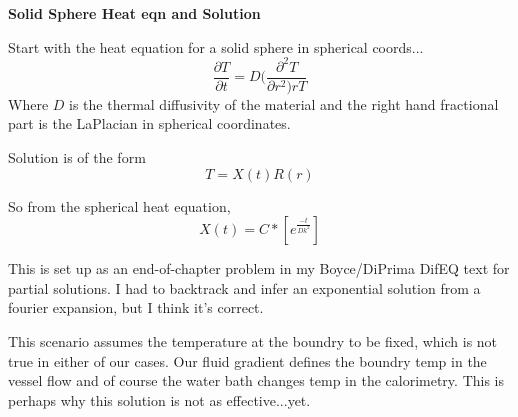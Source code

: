 \documentclass[a4paper,10pt]{scrreprt}
\begin{document}
\begin{center}
\textbf{Solid Sphere Heat eqn and Solution}
\end{center}

Start with the heat equation for a solid sphere in spherical coords...
\[\frac{\partial T}{\partial t} = D(\frac{\partial^{2}T}{\partial r^2)rT}\]
Where $D$ is the thermal diffusivity of the material and the right hand fractional part is the LaPlacian in spherical coordinates.

Solution is of the form
\[T=X(t)R(r)\]

So from the spherical heat equation,
\[X(t)=C*\left[e^{\tfrac{-t}{Dk^{2}}}\right]\]

This is set up as an end-of-chapter problem in my Boyce/DiPrima DifEQ text for partial solutions. I had to backtrack and infer an exponential solution from a fourier expansion, but I think it's correct.

This scenario assumes the temperature at the boundry to be fixed, which is not true in either of our cases. Our fluid gradient defines the boundry temp in the vessel flow and of course the water bath changes temp in the calorimetry. This is perhaps why this solution is not as effective...yet.
\end{document}
